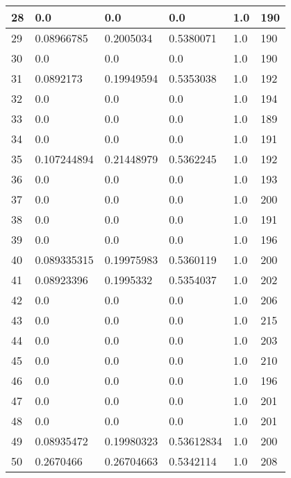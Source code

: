 \begin{longtable}{|l|l|l|l|l|l|}
28 & 0.0 & 0.0 & 0.0 & 1.0 & 190 \\ \hline 
29 & 0.08966785 & 0.2005034 & 0.5380071 & 1.0 & 190 \\ \hline 
30 & 0.0 & 0.0 & 0.0 & 1.0 & 190 \\ \hline 
31 & 0.0892173 & 0.19949594 & 0.5353038 & 1.0 & 192 \\ \hline 
32 & 0.0 & 0.0 & 0.0 & 1.0 & 194 \\ \hline 
33 & 0.0 & 0.0 & 0.0 & 1.0 & 189 \\ \hline 
34 & 0.0 & 0.0 & 0.0 & 1.0 & 191 \\ \hline 
35 & 0.107244894 & 0.21448979 & 0.5362245 & 1.0 & 192 \\ \hline 
36 & 0.0 & 0.0 & 0.0 & 1.0 & 193 \\ \hline 
37 & 0.0 & 0.0 & 0.0 & 1.0 & 200 \\ \hline 
38 & 0.0 & 0.0 & 0.0 & 1.0 & 191 \\ \hline 
39 & 0.0 & 0.0 & 0.0 & 1.0 & 196 \\ \hline 
40 & 0.089335315 & 0.19975983 & 0.5360119 & 1.0 & 200 \\ \hline 
41 & 0.08923396 & 0.1995332 & 0.5354037 & 1.0 & 202 \\ \hline 
42 & 0.0 & 0.0 & 0.0 & 1.0 & 206 \\ \hline 
43 & 0.0 & 0.0 & 0.0 & 1.0 & 215 \\ \hline 
44 & 0.0 & 0.0 & 0.0 & 1.0 & 203 \\ \hline 
45 & 0.0 & 0.0 & 0.0 & 1.0 & 210 \\ \hline 
46 & 0.0 & 0.0 & 0.0 & 1.0 & 196 \\ \hline 
47 & 0.0 & 0.0 & 0.0 & 1.0 & 201 \\ \hline 
48 & 0.0 & 0.0 & 0.0 & 1.0 & 201 \\ \hline 
49 & 0.08935472 & 0.19980323 & 0.53612834 & 1.0 & 200 \\ \hline 
50 & 0.2670466 & 0.26704663 & 0.5342114 & 1.0 & 208 \\ \hline 
\end{longtable}